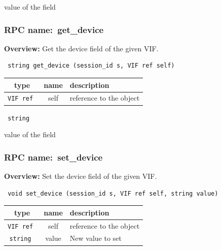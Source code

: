 value of the field
\vspace{0.3cm}
\vspace{0.3cm}
\vspace{0.3cm}
\subsubsection{RPC name:~get\_device}

{\bf Overview:} 
Get the device field of the given VIF.

\begin{verbatim} string get_device (session_id s, VIF ref self)\end{verbatim}



 
\vspace{0.3cm}
\begin{tabular}{|c|c|p{7cm}|}
 \hline
{\bf type} & {\bf name} & {\bf description} \\ \hline
{\tt VIF ref } & self & reference to the object \\ \hline 

\end{tabular}

\vspace{0.3cm}

{\tt 
string
}


value of the field
\vspace{0.3cm}
\vspace{0.3cm}
\vspace{0.3cm}
\subsubsection{RPC name:~set\_device}

{\bf Overview:} 
Set the device field of the given VIF.

\begin{verbatim} void set_device (session_id s, VIF ref self, string value)\end{verbatim}



 
\vspace{0.3cm}
\begin{tabular}{|c|c|p{7cm}|}
 \hline
{\bf type} & {\bf name} & {\bf description} \\ \hline
{\tt VIF ref } & self & reference to the object \\ \hline 

{\tt string } & value & New value to set \\ \hline 

\end{tabular}

